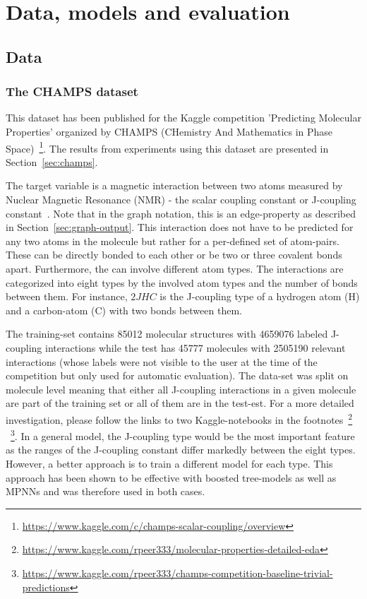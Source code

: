 \chapter{Data, models and evaluation}
\label{chapter:Methods}


\section{Data}
\label{sec:data-and-features}


\subsection{The CHAMPS dataset}
\label{sec:champs-dataset}

This dataset has been published for the Kaggle competition 'Predicting Molecular Properties' organized by CHAMPS (CHemistry And Mathematics in Phase Space)~\footnote{\url{https://www.kaggle.com/c/champs-scalar-coupling/overview}}. The results from experiments using this dataset are presented in Section~\ref{sec:champs}.
	
The target variable is a magnetic interaction between two atoms measured by Nuclear Magnetic Resonance (NMR) - the scalar coupling constant or J-coupling constant~\cite{NMR}.
Note that in the graph notation, this is an edge-property as described in Section~\ref{sec:graph-output}. This interaction does not have to be predicted for any two atoms in the molecule but rather for a per-defined set of atom-pairs. These can be directly bonded to each other or be two or three covalent bonds apart. Furthermore, the can involve different atom types. The interactions are categorized into eight types by the involved atom types and the number of bonds between them. For instance, $2JHC$ is the J-coupling type of a hydrogen atom (H) and a carbon-atom (C) with two bonds between them.

The training-set contains 85012 molecular structures with 4659076 labeled J-coupling interactions while the test has 45777 molecules with 2505190 relevant interactions (whose labels were not visible to the user at the time of the competition but only used for automatic evaluation). The data-set was split on molecule level meaning that either all J-coupling interactions in a given molecule are part of the training set or all of them are in the test-est. For a more detailed investigation, please follow the links to two Kaggle-notebooks in the footnotes~\footnote{\url{https://www.kaggle.com/rpeer333/molecular-properties-detailed-eda}}
~\footnote{\url{https://www.kaggle.com/rpeer333/champs-competition-baseline-trivial-predictions}}.
In a general model, the J-coupling type would be the most important feature as the ranges of the J-coupling constant differ markedly between the eight types. However, a better approach is to train a different model for each type. This approach has been shown to be effective with boosted tree-models as well as MPNNs and was therefore used in both cases.

